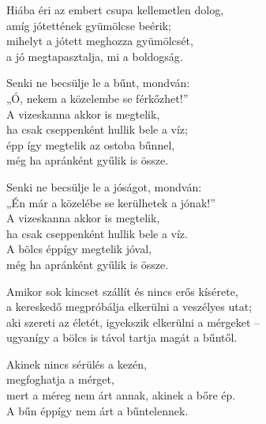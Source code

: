 \begin{dhpverse}

 Hiába éri az embert csupa kellemetlen dolog,\\
amíg jótettének gyümölcse beérik;\\
mihelyt a jótett meghozza gyümölcsét,\\
a jó megtapasztalja, mi a boldogság.

 Senki ne becsülje le a bűnt, mondván:\\
„Ó, nekem a közelembe se férkőzhet!”\\
A vizeskanna akkor is megtelik,\\
ha csak cseppenként hullik bele a víz;\\
épp így megtelik az ostoba bűnnel,\\
még ha apránként gyűlik is össze.

 Senki ne becsülje le a jóságot, mondván:\\
„Én már a közelébe se kerülhetek a jónak!”\\
A vizeskanna akkor is megtelik,\\
ha csak cseppenként hullik bele a víz.\\
A bölcs éppígy megtelik jóval,\\
még ha apránként gyűlik is össze.

 Amikor sok kincset szállít és nincs erős kísérete,\\
a kereskedő megpróbálja elkerülni a veszélyes utat;\\
aki szereti az életét, igyekszik elkerülni a mérgeket –\\
ugyanígy a bölcs is távol tartja magát a bűntől.

 Akinek nincs sérülés a kezén,\\
megfoghatja a mérget,\\
mert a méreg nem árt annak, akinek a bőre ép.\\
A bűn éppígy nem árt a bűntelennek.

\end{dhpverse}
\newpage
